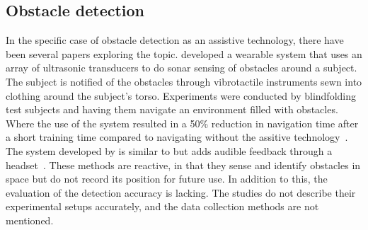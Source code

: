 \documentclass[prodmode,acmtosem]{acmsmall} %
\begin{document}
\subsection{Obstacle detection}
In the specific case of obstacle detection as an assistive technology, there have been several papers exploring the topic. \citet{Cardin2007} developed a wearable system that uses an array of ultrasonic transducers to do sonar sensing of obstacles around a subject. The subject is notified of the obstacles through vibrotactile instruments sewn into clothing around the subject's torso. Experiments were conducted by blindfolding test subjects and having them navigate an environment filled with obstacles. Where the use of the system resulted in a 50\% reduction in navigation time after a short training time compared to navigating without the assitive technology~\cite{Cardin2007}. The system developed by \citet{Shin2007} is similar to \citet{Cardin2007} but adds audible feedback through a headset~\cite{Shin2007}. These methods are reactive, in that they sense and identify obstacles in space but do not record its position for future use. In addition to this, the evaluation of the detection accuracy is lacking. The studies do not describe their experimental setups accurately, and the data collection methods are not mentioned.
\end{document}
